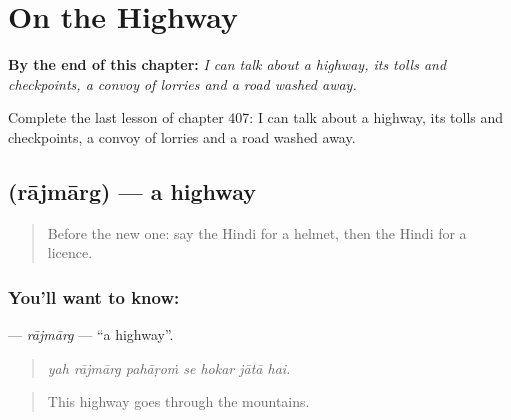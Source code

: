 
\chapter{On the Highway}
\label{ch:hi-on-the-highway}

\begin{chapteropening}
\textbf{By the end of this chapter:} \emph{I can talk about a highway, its tolls and checkpoints, a convoy of lorries and a road washed away.}

Complete the last lesson of chapter 407: I can talk about a highway, its tolls and checkpoints, a convoy of lorries and a road washed away.
\end{chapteropening}

\section[\texorpdfstring{\hi{राजमार्ग} (rājmārg)}{राजमार्ग (rājmārg)}]{ (rājmārg) — a highway}

\label{lesson:HI-C407-rajmarg}



\begin{quote}
Before the new one: say the Hindi for a helmet, then the Hindi for a licence.
\end{quote}

\subsection*{You'll want to know: }
\textbf{} — \emph{rājmārg} — \textquotedblleft{}a highway\textquotedblright{}.

\begin{quote}
      
\end{quote}

\begin{quote}
\emph{yah rājmārg pahāṛoṁ se hokar jātā hai.}
\end{quote}

\begin{quote}
This highway goes through the mountains.
\end{quote}

